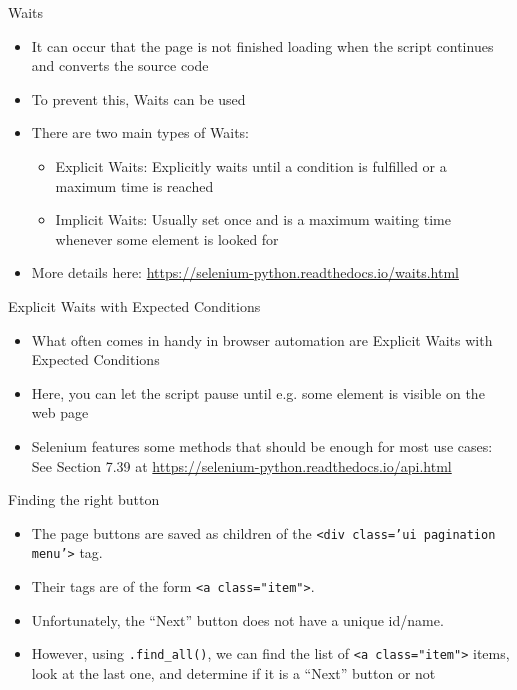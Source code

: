 \begin{frame}{Waits}
\begin{itemize}
	\item It can occur that the page is not finished loading when the script continues and converts the source code
	\item To prevent this, Waits can be used
	\item There are two main types of Waits:
	\begin{itemize}
		\item Explicit Waits: Explicitly waits until a condition is fulfilled or a maximum time is reached
		\item Implicit Waits: Usually set once and is a maximum waiting time whenever some element is looked for
	\end{itemize}
	\item More details here: \url{https://selenium-python.readthedocs.io/waits.html}
\end{itemize}
\end{frame}

\begin{frame}{Explicit Waits with Expected Conditions}
\begin{itemize}
	\item What often comes in handy in browser automation are Explicit Waits with Expected Conditions
	\item Here, you can let the script pause until e.g. some element is visible on the web page
	\item Selenium features some methods that should be enough for most use cases: See Section 7.39 at \url{https://selenium-python.readthedocs.io/api.html}
\end{itemize}
\end{frame}

\begin{frame}[fragile]{Finding the right button}
\begin{itemize}
	\item The page buttons are saved as children of the \texttt{<div class='ui pagination menu'>} tag.
	\item Their tags are of the form \texttt{<a class="item">}.
	\item Unfortunately, the ``Next'' button does not have a unique id/name.
	\item However, using \texttt{.find_all()}, we can find the list of \texttt{<a class="item">} items, look at the last one, and determine if it is a ``Next'' button or not
\end{itemize}
\end{frame}